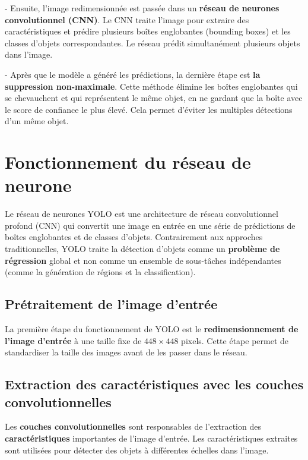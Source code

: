 \documentclass[a4paper,12pt]{article}
\begin{document}
- Ensuite, l'image redimensionnée est passée dans un \textbf{réseau de neurones convolutionnel (CNN)}. Le CNN traite l'image pour extraire des caractéristiques et prédire plusieurs boîtes englobantes (bounding boxes) et les classes d'objets correspondantes. Le réseau prédit simultanément plusieurs objets dans l'image.

- Après que le modèle a généré les prédictions, la dernière étape est \textbf{la suppression non-maximale}. Cette méthode élimine les boîtes englobantes qui se chevauchent et qui représentent le même objet, en ne gardant que la boîte avec le score de confiance le plus élevé. Cela permet d'éviter les multiples détections d'un même objet.


\section{Fonctionnement du réseau de neurone}

Le réseau de neurones YOLO est une architecture de réseau convolutionnel profond (CNN) qui convertit une image en entrée en une série de prédictions de boîtes englobantes et de classes d'objets. Contrairement aux approches traditionnelles, YOLO traite la détection d'objets comme un \textbf{problème de régression} global et non comme un ensemble de sous-tâches indépendantes (comme la génération de régions et la classification).

\subsection{Prétraitement de l'image d'entrée}
La première étape du fonctionnement de YOLO est le \textbf{redimensionnement de l'image d'entrée} à une taille fixe de \(448 \times 448\) pixels. Cette étape permet de standardiser la taille des images avant de les passer dans le réseau.

\subsection{Extraction des caractéristiques avec les couches convolutionnelles}

Les \textbf{couches convolutionnelles} sont responsables de l'extraction des \textbf{caractéristiques} importantes de l'image d'entrée. Les caractéristiques extraites sont utilisées pour détecter des objets à différentes échelles dans l'image.
\end{document}
